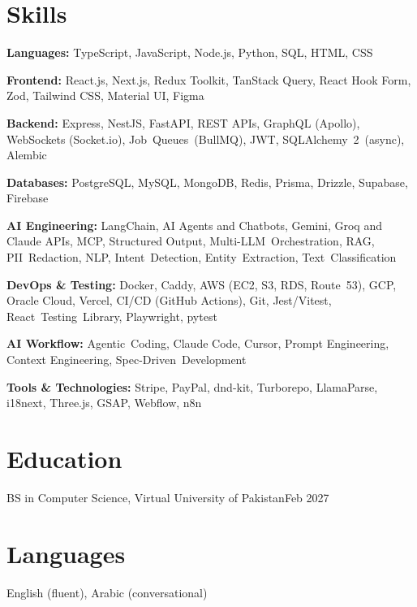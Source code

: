 \documentclass[a4paper]{article}
\newlength{\entryindent}    \setlength{\entryindent}{10pt}   %
\newlength{\markerwidth}    \setlength{\markerwidth}{3pt}    %
\newlength{\skillgap}       \setlength{\skillgap}{2.5pt}     %
\newlength{\skilllinegap}   \setlength{\skilllinegap}{1.5pt} %
\newcommand{\jobmarker}{{\color{headgray}%
  \smash{\rule[-1pt]{\markerwidth}{\dimexpr\fontcharht\font`H+2pt\relax}}}}
\newcommand{\job}[3]{%
  \makebox[\entryindent][l]{\jobmarker}%
  {\semiboldfont\color{black}#1}, #2\hfill #3\par
}
\newenvironment{skills}
  {\par\setlength{\baselineskip}{\dimexpr\baselineskip+\skilllinegap\relax}%
   \let\skillbefore\relax}
  {\par}
\newcommand{\skill}[2]{%
  \skillbefore
  {\bfseries #1:} #2\par
  \def\skillbefore{\vspace{\dimexpr\skillgap-\skilllinegap\relax}}%
}
\begin{document}

\section*{Skills}

\begin{skills}
  \skill{Languages}{TypeScript, JavaScript, Node.js, Python, SQL, HTML, CSS}
  \skill{Frontend}{React.js, Next.js, Redux Toolkit, TanStack Query,
    React Hook Form, Zod, Tailwind CSS, Material UI, Figma}
  \skill{Backend}{Express, NestJS, FastAPI, REST APIs, GraphQL (Apollo), WebSockets (Socket.io),
    Job~Queues~(BullMQ), JWT, SQLAlchemy~2~(async), Alembic}
  \skill{Databases}{PostgreSQL, MySQL, MongoDB, Redis, Prisma, Drizzle, Supabase, Firebase}
  \skill{AI Engineering}{LangChain, AI Agents and Chatbots, Gemini, Groq and Claude APIs,
    MCP, Structured Output, Multi-LLM~Orchestration, RAG,
    PII~Redaction, NLP, Intent~Detection, Entity~Extraction, Text~Classification}
  \skill{DevOps \& Testing}{Docker, Caddy, AWS (EC2, S3, RDS, Route~53), GCP, Oracle Cloud, Vercel, CI/CD (GitHub Actions),
    Git, Jest/Vitest, React~Testing~Library, Playwright, pytest}
  \skill{AI Workflow}{Agentic~Coding, Claude Code, Cursor, Prompt Engineering,
    Context Engineering, Spec-Driven~Development}
  \skill{Tools \& Technologies}{Stripe, PayPal, dnd-kit, Turborepo, LlamaParse, i18next,
    Three.js, GSAP, Webflow, n8n}
\end{skills}



\section*{Education}

\job{BS in Computer Science}{Virtual University of Pakistan}{Feb 2027}



\section*{Languages}

English (fluent), Arabic (conversational)\par
\end{document}
